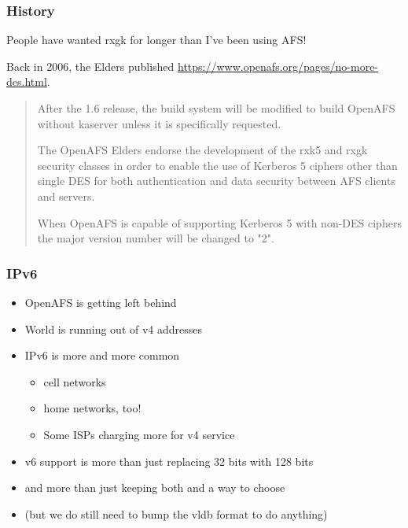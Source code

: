 \documentclass{beamer}
\begin{document}
\begin{frame}[fragile]
\frametitle{History}
People have wanted rxgk for longer than I've been using AFS!

\vspace{1em}
Back in 2006, the Elders published
\url{https://www.openafs.org/pages/no-more-des.html}.
\begin{quote}
After the 1.6 release, the build system will be modified to build OpenAFS
without kaserver unless it is specifically requested.

The OpenAFS Elders endorse the development of the rxk5 and rxgk security
classes in order to enable the use of Kerberos 5 ciphers other than single DES
for both authentication and data security between AFS clients and servers.

When OpenAFS is capable of supporting Kerberos 5 with non-DES ciphers the
major version number will be changed to "2".
\end{quote}
\end{frame}

\begin{frame}
\frametitle{IPv6}
\begin{itemize}
\item{OpenAFS is getting left behind}
\item{World is running out of v4 addresses}
\item{IPv6 is more and more common
	\begin{itemize}
	\item{cell networks}
	\item{home networks, too!}
	\item{Some ISPs charging more for v4 service}
	\end{itemize}
}
\item{v6 support is more than just replacing 32 bits with 128 bits}
\pause
\item{and more than just keeping both and a way to choose}
\item{(but we do still need to bump the vldb format to do anything)}
\end{itemize}
\end{frame}
\end{document}
